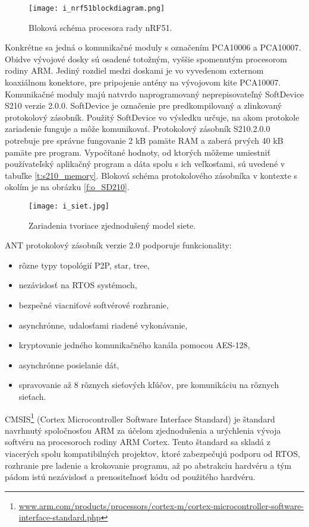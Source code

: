 \documentclass[12pt,a4paper,oneside,openright]{report}
\begin{document}
\begin{figure*}[h]
	\centering
	\texttt{[image: i\_nrf51blockdiagram.png]}
	\caption{Bloková schéma procesora rady nRF51\cite{nRF51}.}
	\label{f:o_i_nrf51blockdiagram}
\end{figure*}

Konkrétne sa jedná o komunikačné moduly s označením PCA10006 a PCA10007. Obidve vývojové dosky sú osadené totožným, vyššie spomenutým procesorom rodiny ARM. Jediný rozdiel medzi doskami je vo vyvedenom externom koaxiálnom konektore, pre pripojenie antény na vývojovom kite PCA10007.
Komunikačné moduly majú natvrdo naprogramovaný neprepisovateľný SoftDevice S210 verzie 2.0.0. SoftDevice je označenie pre predkompilovaný a zlinkovaný protokolový zásobník. Použitý SoftDevice vo výsledku určuje, na akom protokole zariadenie funguje a môže komunikovať. Protokolový zásobník S210.2.0.0 potrebuje pre správne fungovanie 2 kB pamäte RAM a zaberá prvých 40 kB pamäte pre program. Vypočítané hodnoty, od ktorých môžeme umiestniť používateľský aplikačný program a dáta spolu s ich veľkosťami, sú uvedené v tabuľke \ref{t:s210_memory}. Bloková schéma protokolového zásobníka v kontexte s okolím je na obrázku \ref{f:o_SD210}.

\begin{figure*}[h]
	\centering
	\texttt{[image: i\_siet.jpg]}
	\caption{Zariadenia tvoriace zjednodušený model siete.}
	\label{f:i_devices}
\end{figure*}

ANT protokolový zásobník verzie 2.0 podporuje funkcionality\cite{SD210}:
\begin{itemize}
	\item rôzne typy topológií P2P, star, tree,
	\item nezávislosť na RTOS systémoch,
	\item bezpečné viacniťové softvérové rozhranie,
	\item asynchrónne, udalosťami riadené vykonávanie,
	\item kryptovanie jedného komunikačného kanála pomocou AES-128,
	\item asynchrónne posielanie dát,
	\item spravovanie až 8 rôznych sieťových kľúčov, pre komunikáciu na rôznych sieťach.
\end{itemize}
\onehalfspacing

CMSIS\footnote{\url{www.arm.com/products/processors/cortex-m/cortex-microcontroller-software-interface-standard.php}} (Cortex Microcontroller Software Interface Standard) je štandard navrhnutý spoločnosťou ARM za účelom zjednodušenia a urýchlenia vývoja softvéru na procesoroch rodiny ARM Cortex. Tento štandard sa skladá z viacerých spolu kompatibilných projektov, ktoré zabezpečujú podporu od RTOS, rozhranie pre ladenie a krokovanie programu, až po abstrakciu hardvéru a tým pádom istú nezávislosť a prenositeľnosť kódu od použitého hardvéru\cite{CMSIS}.
\end{document}
